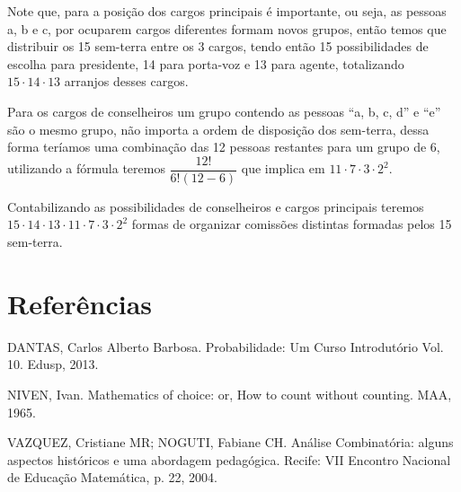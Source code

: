Note que, para a posição dos cargos principais é importante, ou seja, as pessoas a, b e c, por ocuparem cargos diferentes formam novos grupos, então temos que distribuir os 15 sem-terra entre os 3 cargos, tendo então 15 possibilidades de escolha para presidente, 14 para porta-voz e 13 para agente, totalizando $15 \cdot 14 \cdot 13$ arranjos desses cargos.

Para os cargos de conselheiros um grupo contendo as pessoas ``a, b, c, d'' e ``e'' são o mesmo grupo, não importa a ordem de disposição dos sem-terra, dessa forma teríamos uma combinação das 12 pessoas restantes para um grupo de 6, utilizando a fórmula teremos $\dfrac{12!}{6!(12-6)}$ que implica em $11 \cdot 7 \cdot 3 \cdot 2^{2}$.

Contabilizando as possibilidades de conselheiros e cargos principais teremos  $15 \cdot 14 \cdot 13 \cdot 11 \cdot 7 \cdot 3 \cdot 2^{2}$ formas de organizar comissões distintas formadas pelos 15 sem-terra.

 \section*{Referências}
\noindent
DANTAS, Carlos Alberto Barbosa. Probabilidade: Um Curso Introdutório Vol. 10. Edusp, 2013.

\noindent
NIVEN, Ivan. Mathematics of choice: or, How to count without counting. MAA, 1965.

\noindent
VAZQUEZ, Cristiane MR; NOGUTI, Fabiane CH. Análise Combinatória: alguns aspectos históricos e uma abordagem pedagógica. Recife: VII Encontro Nacional de Educação Matemática, p. 22, 2004.
